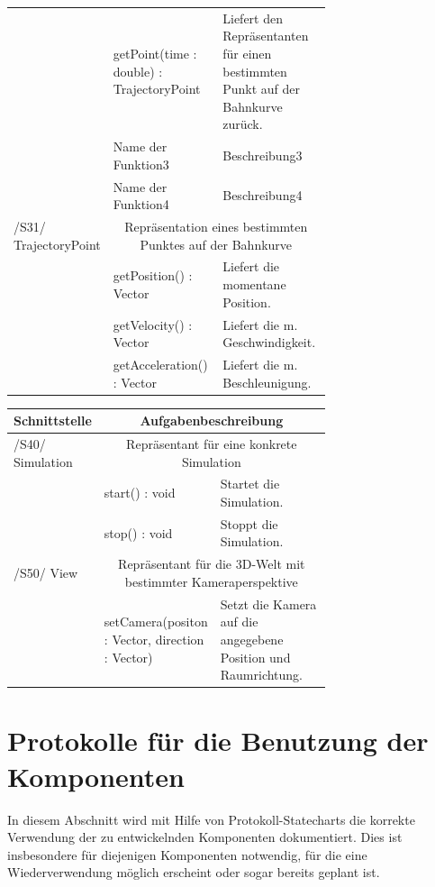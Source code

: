 \begin{tabular}[ht]{|l|p{0.35\linewidth}|p{0.35\linewidth}|}
 & getPoint(time : double) : TrajectoryPoint & Liefert den Repräsentanten für einen bestimmten Punkt auf der Bahnkurve zurück.\\ 
 & Name der Funktion3 & Beschreibung3\\ 
 & Name der Funktion4 & Beschreibung4\\ 
 \hline
 	/S31/ TrajectoryPoint & \multicolumn{2}{|c|}{Repräsentation eines bestimmten Punktes auf der Bahnkurve}\\
 \hline
 & getPosition() : Vector & Liefert die momentane Position.\\ 
 & getVelocity() : Vector & Liefert die m. Geschwindigkeit.\\ 
 & getAcceleration() : Vector & Liefert die m. Beschleunigung. \\ 
 \hline
 \end{tabular}

\begin{tabular}[ht]{|l|p{0.35\linewidth}|p{0.35\linewidth}|}
 \hline
 Schnittstelle & \multicolumn{2}{|c|}{Aufgabenbeschreibung}\\
 \hline
 \hline
    /S40/ Simulation & \multicolumn{2}{|c|}{Repräsentant für eine konkrete Simulation}\\
 \hline
 & start() : void & Startet die Simulation.\\ 
 & stop() : void & Stoppt die Simulation. \\ 
\hline
	/S50/ View & \multicolumn{2}{|c|}{Repräsentant für die 3D-Welt mit bestimmter Kameraperspektive}\\
\hline
 & setCamera(positon : Vector, direction : Vector) & Setzt die Kamera auf die angegebene Position und Raumrichtung. \\ 
 \hline
 \end{tabular}





\section{Protokolle für die Benutzung der Komponenten}

In diesem Abschnitt wird mit Hilfe von Protokoll-Statecharts die korrekte
Verwendung der zu entwickelnden Komponenten dokumentiert. Dies ist insbesondere
für diejenigen Komponenten notwendig, für die eine Wiederverwendung möglich
erscheint oder sogar bereits geplant ist.


